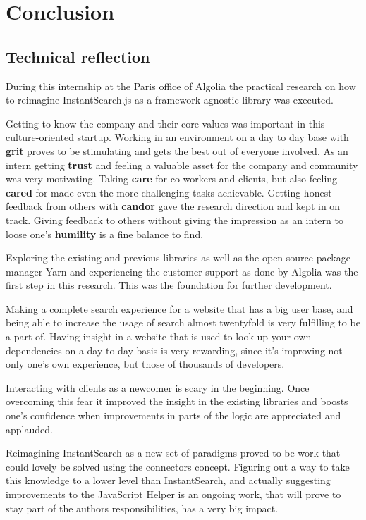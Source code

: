 
\chapter{Conclusion} %
\label{chp:conclusion}

\section{Technical reflection}

During this internship at the Paris office of Algolia the practical research on how to reimagine InstantSearch.js as a framework-agnostic library was executed.

Getting to know the company and their core values was important in this culture-oriented startup. Working in an environment on a day to day base with \textbf{grit} proves to be stimulating and gets the best out of everyone involved. As an intern getting \textbf{trust} and feeling a valuable asset for the company and community was very motivating. Taking \textbf{care} for co-workers and clients, but also feeling \textbf{cared} for made even the more challenging tasks achievable. Getting honest feedback from others with \textbf{candor} gave the research direction and kept in on track. Giving feedback to others without giving the impression as an intern to loose one's \textbf{humility} is a fine balance to find.

Exploring the existing and previous libraries as well as the open source package manager Yarn and experiencing the customer support as done by Algolia was the first step in this research. This was the foundation for further development.

Making a complete search experience for a website that has a big user base, and being able to increase the usage of search almost twentyfold is very fulfilling to be a part of. Having insight in a website that is used to look up your own dependencies on a day-to-day basis is very rewarding, since it's improving not only one's own experience, but those of thousands of developers.

Interacting with clients as a newcomer is scary in the beginning. Once overcoming this fear it improved the insight in the existing libraries and boosts one's confidence when improvements in parts of the logic are appreciated and applauded.

Reimagining InstantSearch as a new set of paradigms proved to be work that could lovely be solved using the connectors concept. Figuring out a way to take this knowledge to a lower level than InstantSearch, and actually suggesting improvements to the JavaScript Helper is an ongoing work, that will prove to stay part of the authors responsibilities, has a very big impact.

